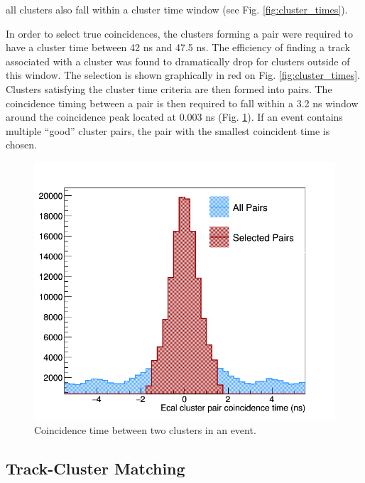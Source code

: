 all clusters also fall within a cluster time window (see Fig. \ref{fig:cluster_times}). 

In order to select true coincidences, the clusters forming a pair were 
required to have a cluster time between 42 ns and 47.5 ns.  The efficiency
of finding a track associated with a cluster was found to dramatically drop 
for clusters outside of this window.  The selection is
shown graphically in red on Fig. \ref{fig:cluster_times}.  Clusters satisfying
the cluster time criteria are then formed into pairs.  The coincidence timing
between a pair is then required to fall within a 3.2 ns window around the 
coincidence peak located at 0.003 ns (Fig. \ref{fig:coin_time}).  If an event
contains multiple ``good'' cluster pairs, the pair with the smallest coincident
time is chosen. 
\begin{figure}[t]
    \centering
    \includegraphics[width=.9\textwidth]{images/20160428_coincidence_time.png}
    \caption{Coincidence time between two clusters in an event.}
    \label{fig:coin_time}
\end{figure}  
 
\subsection{Track-Cluster Matching}
   
